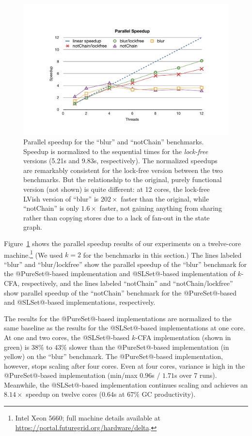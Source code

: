 \begin{figure}  
\begin{center}
  \includegraphics[trim=0.5in 0.5in 0.5in 1in,clip,width=\textwidth]{chapter4/figures/CFA_speedups.pdf}
\end{center}
  \caption{Parallel speedup for the ``blur'' and ``notChain''
    benchmarks.  Speedup is normalized to the sequential times for the
    \emph{lock-free} versions (5.21s and 9.83s, respectively).  The
    normalized speedups are remarkably consistent for the lock-free
    version between the two benchmarks.  But the relationship to the
    original, purely functional version (not shown) is quite
    different: at 12 cores, the lock-free LVish version of ``blur'' is
    $202\times$ faster than the original, while ``notChain'' is only
    $1.6\times$ faster, not gaining anything from sharing rather than
    copying stores due to a lack of fan-out in the state graph.}
  \label{fig:bench}
\end{figure}

Figure~\ref{fig:bench} shows the parallel speedup results of our
experiments on a twelve-core machine.\footnote{Intel Xeon 5660; full
  machine details available at
  \url{https://portal.futuregrid.org/hardware/delta}.}  (We used $k=2$
for the benchmarks in this section.)  The lines labeled ``blur'' and
``blur/lockfree'' show the parallel speedup of the ``blur'' benchmark
for the @PureSet@-based implementation and @SLSet@-based
implementation of $k$-CFA, respectively, and the lines labeled
``notChain'' and ``notChain/lockfree'' show parallel speedup of the
``notChain'' benchmark for the @PureSet@-based and @SLSet@-based
implementations, respectively.

The results for the @PureSet@-based implementations are normalized to
the same baseline as the results for the @SLSet@-based implementations
at one core.  At one and two cores, the @SLSet@-based $k$-CFA
implementation (shown in green) is $38\%$ to $43\%$ slower than the
@PureSet@-based implementation (in yellow) on the ``blur'' benchmark.
The @PureSet@-based implementation, however, stops scaling after four
cores.  Even at four cores, variance is high in the @PureSet@-based
implementation (min/max $0.96$s / $1.71$s over 7 runs).  Meanwhile,
the @SLSet@-based implementation continues scaling and achieves an
$8.14\times$ speedup on twelve cores ($0.64$s at $67\%$ GC
productivity).

